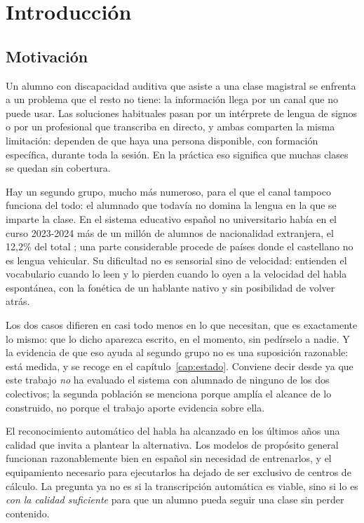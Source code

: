 \chapter{Introducción}

\section{Motivación}

Un alumno con discapacidad auditiva que asiste a una clase magistral se enfrenta a un
problema que el resto no tiene: la información llega por un canal que no puede usar. Las
soluciones habituales pasan por un intérprete de lengua de signos o por un profesional que
transcriba en directo, y ambas comparten la misma limitación: dependen de que haya una
persona disponible, con formación específica, durante toda la sesión. En la práctica eso
significa que muchas clases se quedan sin cobertura.

Hay un segundo grupo, mucho más numeroso, para el que el canal tampoco funciona del todo:
el alumnado que todavía no domina la lengua en la que se imparte la clase. En el sistema
educativo español no universitario había en el curso 2023-2024 más de un millón de alumnos
de nacionalidad extranjera, el 12,2\% del total \cite{mefpd2024datos}; una parte
considerable procede de países donde el castellano no es lengua vehicular. Su dificultad no
es sensorial sino de velocidad: entienden el vocabulario cuando lo leen y lo pierden cuando
lo oyen a la velocidad del habla espontánea, con la fonética de un hablante nativo y sin
posibilidad de volver atrás.

Los dos casos difieren en casi todo menos en lo que necesitan, que es exactamente lo mismo:
que lo dicho aparezca escrito, en el momento, sin pedírselo a nadie. Y la evidencia de que
eso ayuda al segundo grupo no es una suposición razonable: está medida, y se recoge en el
capítulo~\ref{cap:estado}. Conviene decir desde ya que este trabajo \emph{no} ha evaluado
el sistema con alumnado de ninguno de los dos colectivos; la segunda población se menciona
porque amplía el alcance de lo construido, no porque el trabajo aporte evidencia sobre
ella.

El reconocimiento automático del habla ha alcanzado en los últimos años una calidad que
invita a plantear la alternativa. Los modelos de propósito general funcionan
razonablemente bien en español sin necesidad de entrenarlos, y el equipamiento necesario
para ejecutarlos ha dejado de ser exclusivo de centros de cálculo. La pregunta ya no es si
la transcripción automática es viable, sino si lo es \emph{con la calidad suficiente} para
que un alumno pueda seguir una clase sin perder contenido.

